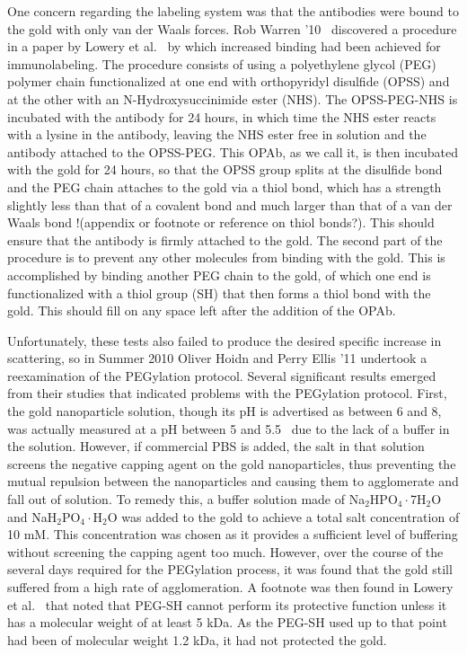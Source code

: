 One concern regarding the labeling system was that the antibodies were bound to the gold with only van der Waals forces. Rob Warren '10~\citep{warren} discovered a procedure in a paper by Lowery et al.~\citep{westpegylation} by which increased binding had been achieved for immunolabeling. The procedure consists of using a polyethylene glycol (PEG) polymer chain functionalized at one end with orthopyridyl disulfide (OPSS) and at the other with an N-Hydroxysuccinimide ester (NHS). The OPSS-PEG-NHS is incubated with the antibody for 24 hours, in which time the NHS ester reacts with a lysine in the antibody, leaving the NHS ester free in solution and the antibody attached to the OPSS-PEG. This OPAb, as we call it, is then incubated with the gold for 24 hours, so that the OPSS group splits at the disulfide bond and the PEG chain attaches to the gold via a thiol bond, which has a strength slightly less than that of a covalent bond and much larger than that of a van der Waals bond !(appendix or footnote or reference on thiol bonds?). This should ensure that the antibody is firmly attached to the gold. The second part of the procedure is to prevent any other molecules from binding with the gold. This is accomplished by binding another PEG chain to the gold, of which one end is functionalized with a thiol group (SH) that then forms a thiol bond with the gold. This should fill on any space left after the addition of the OPAb. 

Unfortunately, these tests also failed to produce the desired specific increase in scattering, so in Summer 2010 Oliver Hoidn and Perry Ellis '11 undertook a reexamination of the PEGylation protocol. Several significant results emerged from their studies that indicated problems with the PEGylation protocol. First, the gold nanoparticle solution, though its pH is advertised as between 6 and 8, was actually measured at a pH between 5 and 5.5~\citep{hoidnellis} due to the lack of a buffer in the solution. However, if commercial PBS is added, the salt in that solution screens the negative capping agent on the gold nanoparticles, thus preventing the mutual repulsion between the nanoparticles and causing them to agglomerate and fall out of solution. To remedy this, a buffer solution made of Na$_2$HPO$_4\cdot$7H$_2$O and NaH$_2$PO$_4\cdot$H$_2$O was added to the gold to achieve a total salt concentration of 10 mM. This concentration was chosen as it provides a sufficient level of buffering without screening the capping agent too much. However, over the course of the several days required for the PEGylation process, it was found that the gold still suffered from a high rate of agglomeration. A footnote was then found in Lowery et al.~\citep{westpegylation} that noted that PEG-SH cannot perform its protective function unless it has a molecular weight of at least 5 kDa. As the PEG-SH used up to that point had been of molecular weight 1.2 kDa, it had not protected the gold.

